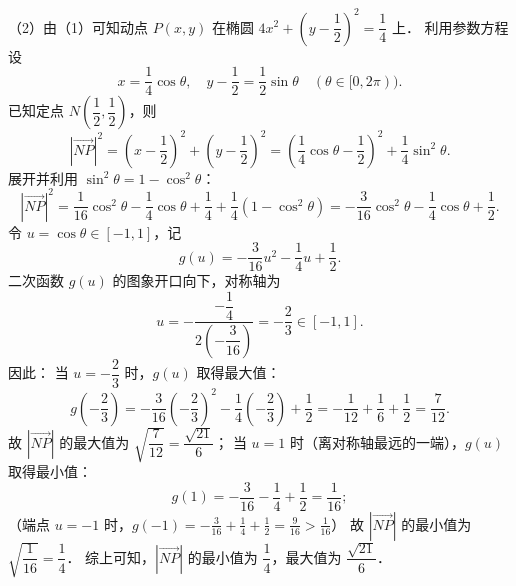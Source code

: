 \begin{answer}
（2）由（1）可知动点 $P(x, y)$ 在椭圆 $4x^2 + \left(y - \dfrac{1}{2}\right)^2 = \dfrac{1}{4}$ 上．
利用参数方程设
\nopagebreak[4]
\[
x = \frac{1}{4}\cos\theta, \quad y - \frac{1}{2} = \frac{1}{2}\sin\theta \quad (\theta \in [0, 2\pi)).
\]
已知定点 $N\left(\dfrac{1}{2}, \dfrac{1}{2}\right)$，则
\nopagebreak[4]
\[
|\vec{NP}|^2 = \left(x - \frac{1}{2}\right)^2 + \left(y - \frac{1}{2}\right)^2 = \left(\frac{1}{4}\cos\theta - \frac{1}{2}\right)^2 + \frac{1}{4}\sin^2\theta.
\]
展开并利用 $\sin^2\theta = 1 - \cos^2\theta$：
\nopagebreak[4]
\[
|\vec{NP}|^2 = \frac{1}{16}\cos^2\theta - \frac{1}{4}\cos\theta + \frac{1}{4} + \frac{1}{4}(1 - \cos^2\theta) = -\frac{3}{16}\cos^2\theta - \frac{1}{4}\cos\theta + \frac{1}{2}.
\]
令 $u = \cos\theta \in [-1, 1]$，记
\nopagebreak[4]
\[
g(u) = -\frac{3}{16}u^2 - \frac{1}{4}u + \frac{1}{2}.
\]
二次函数 $g(u)$ 的图象开口向下，对称轴为
\nopagebreak[4]
\[
u = -\frac{-\dfrac{1}{4}}{2 \left(-\dfrac{3}{16}\right)} = -\frac{2}{3} \in [-1, 1].
\]
因此：
当 $u = -\dfrac{2}{3}$ 时，$g(u)$ 取得最大值：
\nopagebreak[4]
\[
g\left(-\frac{2}{3}\right) = -\frac{3}{16}\left(-\frac{2}{3}\right)^2 - \frac{1}{4}\left(-\frac{2}{3}\right) + \frac{1}{2} = -\frac{1}{12} + \frac{1}{6} + \frac{1}{2} = \frac{7}{12}.
\]
故 $|\vec{NP}|$ 的最大值为 $\sqrt{\dfrac{7}{12}} = \dfrac{\sqrt{21}}{6}$；
当 $u = 1$ 时（离对称轴最远的一端），$g(u)$ 取得最小值：
\nopagebreak[4]
\[
g(1) = -\frac{3}{16} - \frac{1}{4} + \frac{1}{2} = \frac{1}{16};
\]
（端点 $u = -1$ 时，$g(-1) = -\frac{3}{16} + \frac{1}{4} + \frac{1}{2} = \frac{9}{16} > \frac{1}{16}$）
故 $|\vec{NP}|$ 的最小值为 $\sqrt{\dfrac{1}{16}} = \dfrac{1}{4}$．
综上可知，$|\vec{NP}|$ 的最小值为 $\dfrac{1}{4}$，最大值为 $\dfrac{\sqrt{21}}{6}$．


\end{answer}

